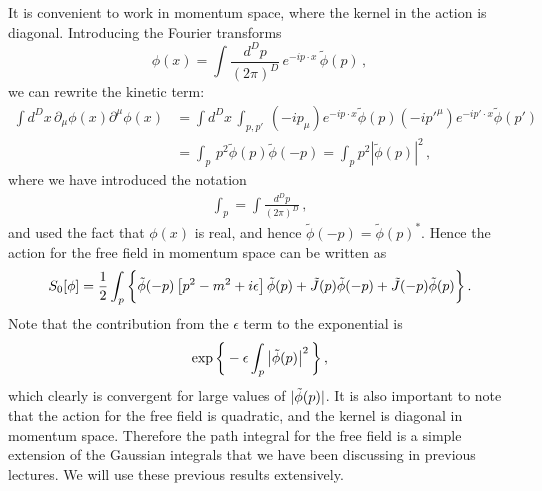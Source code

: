 It is convenient to work in momentum space, where the kernel
in the action is diagonal. Introducing the Fourier transforms
\begin{equation}
  \label{eq:ScalFieldFourier}
  \phi(x) = \int \frac{d^Dp}{(2\pi)^D}\, e^{-i p\cdot x}\,
  \tilde{\phi}(p)\, ,
\end{equation}
we can rewrite the kinetic term: 
\begin{align}
  \int d^Dx\, \partial_\mu \phi(x) \partial^\mu \phi(x) 
  &= \int d^Dx\, \int_{p,p'}\, (-ip_\mu) e^{-ip \cdot x} \tilde{\phi}(p) 
  (-ip'^\mu) e^{-ip'\cdot x} \tilde{\phi}(p') \\
  &= \int_p \, p^2 \tilde{\phi}(p) \tilde{\phi}(-p)
    =  \int_p p^2 \left|\tilde{\phi}(p)\right|^2\, ,
\end{align}
where we have introduced the notation
\begin{align}
  \int_p  = \int \frac{d^Dp}{(2\pi)^D}\, ,
\end{align}
and used the fact that $\phi(x)$ is real, and hence $\tilde{\phi}(-p) =
\tilde{\phi}(p)^*$. Hence the action for the free field in momentum
space can be written as
\begin{align}
  \label{eq:ScalFreeMomSpace}
  S_0[\phi] = \frac12 \int_p \bigg\{
  \tilde{\phi}(-p) \left[p^2 - m^2 + i \epsilon\right] \tilde{\phi}(p) +
  \tilde{J}(p) \tilde{\phi}(-p) + \tilde{J}(-p) \tilde{\phi}(p)
  \bigg\}\, .
\end{align}
Note that the contribution from the $\epsilon$ term to the exponential
is 
\begin{align}
  \exp\bigg\{
  -\epsilon \int_p \left|\tilde{\phi}(p)\right|^2
  \bigg\}\, ,
\end{align}
which clearly is convergent for large values of $|\tilde{\phi}(p)|$.
It is also important to note that the action for the free field is
quadratic, and the kernel is diagonal in momentum space. Therefore the
path integral for the free field is a simple extension of the Gaussian
integrals that we have been discussing in previous lectures. We will
use these previous results extensively. 

